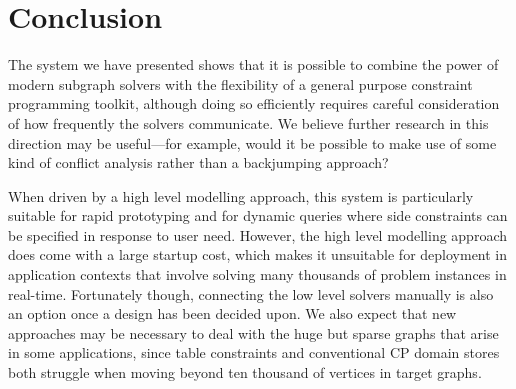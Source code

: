 \documentclass[runningheads]{llncs}
\begin{document}
\section{Conclusion}

The system we have presented shows that it is possible to combine the power of modern subgraph
solvers with the flexibility of a general purpose constraint programming toolkit, although doing so
efficiently requires careful consideration of how frequently the solvers communicate. We believe
further research in this direction may be useful---for example, would it be possible to make use of
some kind of conflict analysis rather than a backjumping approach?

When driven by a high level modelling approach, this system is particularly suitable for rapid
prototyping and for dynamic queries where side constraints can be specified in response to user
need. However, the high level modelling approach does come with a large startup cost, which makes it
unsuitable for deployment in application contexts that involve solving many thousands of problem
instances in real-time. Fortunately though, connecting the low level solvers manually is also an
option once a design has been decided upon. We also expect that new approaches may be necessary to
deal with the huge but sparse graphs that arise in some applications, since table constraints and
conventional CP domain stores both struggle when moving beyond ten thousand of vertices in target
graphs.



\end{document}
